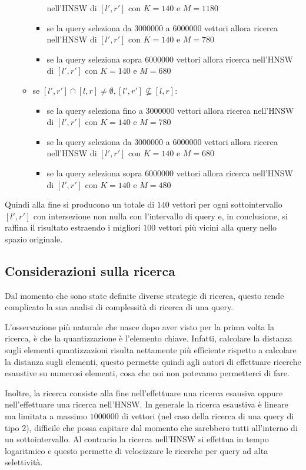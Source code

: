 \begin{itemize}
\begin{itemize}
\begin{itemize}
            nell'HNSW di $[l',r']$ con $K=140$ e $M=1180$
            \item se la query seleziona da $3000000$ a $6000000$ vettori allora ricerca 
            nell'HNSW di $[l',r']$ con $K=140$ e $M=780$
            \item se la query seleziona sopra $6000000$ vettori allora ricerca 
            nell'HNSW di $[l',r']$ con $K=140$ e $M=680$
        \end{itemize}
        \item se $[l',r'] \cap [l,r] \ne \emptyset, [l',r'] \not \subseteq [l,r]$:
        \begin{itemize}
            \item se la query seleziona fino a $3000000$ vettori allora ricerca 
            nell'HNSW di $[l',r']$ con $K=140$ e $M=780$
            \item se la query seleziona da $3000000$ a $6000000$ vettori allora ricerca 
            nell'HNSW di $[l',r']$ con $K=140$ e $M=680$
            \item se la query seleziona sopra $6000000$ vettori allora ricerca 
            nell'HNSW di $[l',r']$ con $K=140$ e $M=480$
        \end{itemize}
    \end{itemize}
\end{itemize}
Quindi alla fine si producono un totale di $140$ vettori per ogni sottointervallo
$[l',r']$ con intersezione non nulla con l'intervallo di query e, in conclusione, 
si raffina il risultato estraendo i migliori $100$ vettori più vicini alla query 
nello spazio originale.   

\subsection{Considerazioni sulla ricerca}

Dal momento che sono state definite diverse strategie di ricerca, questo rende 
complicato la sua analisi di complessità di ricerca di una query.

L'osservazione più naturale che nasce dopo aver visto per la prima volta la ricerca,
è che la quantizzazione è l'elemento chiave. Infatti, calcolare la distanza sugli 
elementi quantizzazioni risulta nettamente più efficiente rispetto a calcolare la 
distanza sugli elementi, questo permette quindi agli autori di effettuare ricerche 
esaustive su numerosi elementi, cosa che noi non potevamo permetterci di fare.

Inoltre, la ricerca consiste alla fine nell'effettuare una ricerca esausiva 
oppure nell'effettuare una ricerca nell'HNSW. In generale la ricerca esaustiva è 
lineare ma limitata a massimo $1000000$ di vettori (nel caso della ricerca di una 
query di tipo 2), difficile che possa capitare dal momento che sarebbero tutti 
all'interno di un sottointervallo. Al contrario la ricerca nell'HNSW si effettua 
in tempo logaritmico e questo permette di velocizzare le ricerche per query ad 
alta selettività. 


